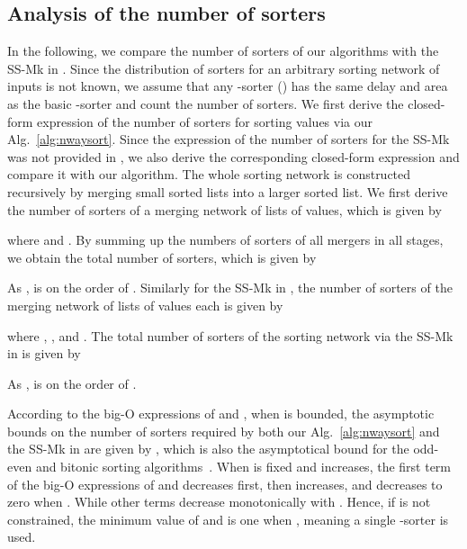 \documentclass[10pt,journal,cspaper,compsoc]{IEEEtran}
\begin{document}
\subsection{Analysis of the number of sorters}
\label{sec:compsorter}
In the following, we compare the number of sorters of our algorithms with the SS-Mk in \cite{gao1997sloping}.
Since the distribution of sorters for an arbitrary sorting network of  inputs is not known, we assume that any -sorter () has the same delay and area as the basic -sorter and count the number of sorters.
We first derive the closed-form expression of the number of sorters for sorting  values via our Alg.~\ref{alg:nwaysort}.
Since the expression of the number of sorters for the SS-Mk was not provided in \cite{gao1997sloping}, we also derive the corresponding closed-form expression and compare it with our algorithm. The whole sorting network is constructed recursively by merging small sorted lists into a larger sorted list. We first derive the number of sorters of a merging network of  lists of  values, which is given by

where  and .
By summing up the numbers of sorters of all mergers in all stages, we obtain the total number of sorters, which is given by

As ,  is on the order of .
Similarly for the SS-Mk in \cite{gao1997sloping}, the number of sorters of the merging network of  lists of  values each is given by

where  , , and .
The total number of sorters of the sorting network via the SS-Mk in \cite{gao1997sloping} is given by

As ,  is on the order of .


According to the big-O expressions of  and , when  is bounded, the asymptotic bounds on the number of sorters required by both our Alg.~\ref{alg:nwaysort} and the SS-Mk in \cite{gao1997sloping} are given by , which is also the asymptotical bound for the odd-even and bitonic sorting algorithms~\cite{Bat68sorting, batcher1990bitonic}.
When  is fixed and  increases, the first term of the big-O expressions of  and  decreases first, then increases, and decreases to zero when . While other terms decrease monotonically with . Hence, if  is not constrained, the minimum value of  and  is one when , meaning a single -sorter is used.
\end{document}
